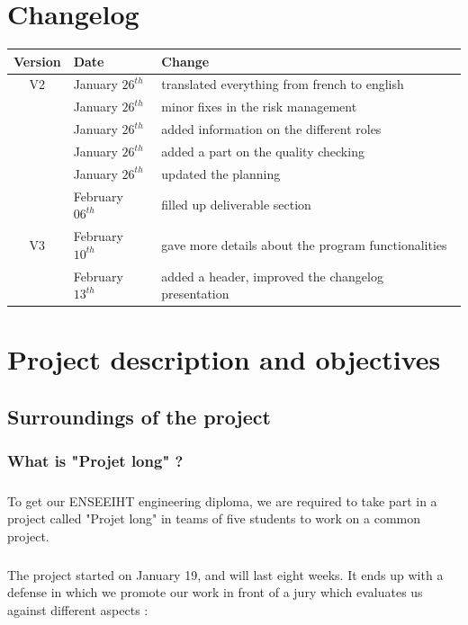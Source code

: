 \documentclass{report}
\begin{document}
\chapter*{Changelog}
\begin{center}
\begin{tabular}{|c|l|l|}
  \hline
  Version & Date & Change  \\
  \hline
  V2 & January $26^{th}$  & translated everything from french to english \\
   & January $26^{th}$  & minor fixes in the risk management \\
   & January $26^{th}$  & added information on the different roles \\
   & January $26^{th}$  & added a part on the quality checking \\
   & January $26^{th}$  & updated the planning \\
   & February $06^{th}$ & filled up deliverable section \\
  \hline
  V3 & February $10^{th}$ & gave more details about the program functionalities \\
  & February $13^{th}$ & added a header, improved the changelog presentation \\
  \hline
\end{tabular}
\end{center}
\chapter{Project description and objectives}

\section{Surroundings of the project}

\subsection{What is "Projet long" ?}

\paragraph{}
\hspace{4mm}\textnormal{To get our ENSEEIHT engineering diploma, we are required to take part in 
a project called "Projet long" in teams of five students to work 
on a common project.}

\paragraph{}
\hspace{4mm}\textnormal{The project started on January 19, and will last eight weeks. It ends up with 
a defense in which we promote our work in front of a jury which evaluates 
us against different aspects :}
\end{document}
